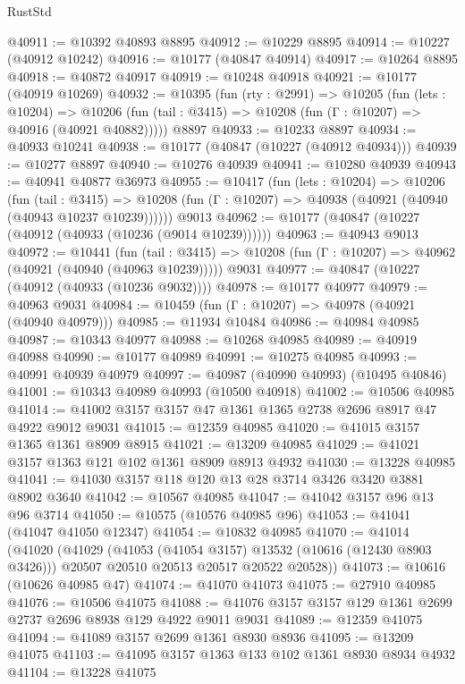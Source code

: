 \begin{lexlean}{RustStd}
\begin{coremodule}
@40911 := @10392 @40893 @8895
@40912 := @10229 @8895
@40914 := @10227 (@40912 @10242)
@40916 := @10177 (@40847 @40914)
@40917 := @10264 @8895
@40918 := @40872 @40917
@40919 := @10248 @40918
@40921 := @10177 (@40919 @10269)
@40932 := @10395
    (fun (rty : @2991) =>
    @10205
      (fun (lets : @10204) =>
      @10206 (fun (tail : @3415) => @10208 (fun (Γ : @10207) => @40916 (@40921 @40882)))))
    @8897
@40933 := @10233 @8897
@40934 := @40933 @10241
@40938 := @10177 (@40847 (@10227 (@40912 @40934)))
@40939 := @10277 @8897
@40940 := @10276 @40939
@40941 := @10280 @40939
@40943 := @40941 @40877 @36973
@40955 := @10417
    (fun (lets : @10204) =>
    @10206
      (fun (tail : @3415) =>
      @10208 (fun (Γ : @10207) => @40938 (@40921 (@40940 (@40943 @10237 @10239))))))
    @9013
@40962 := @10177 (@40847 (@10227 (@40912 (@40933 (@10236 (@9014 @10239))))))
@40963 := @40943 @9013
@40972 := @10441
    (fun (tail : @3415) => @10208 (fun (Γ : @10207) => @40962 (@40921 (@40940 (@40963 @10239)))))
    @9031
@40977 := @40847 (@10227 (@40912 (@40933 (@10236 @9032))))
@40978 := @10177 @40977
@40979 := @40963 @9031
@40984 := @10459 (fun (Γ : @10207) => @40978 (@40921 (@40940 @40979)))
@40985 := @11934 @10484
@40986 := @40984 @40985
@40987 := @10343 @40977
@40988 := @10268 @40985
@40989 := @40919 @40988
@40990 := @10177 @40989
@40991 := @10275 @40985
@40993 := @40991 @40939 @40979
@40997 := @40987 (@40990 @40993) (@10495 @40846)
@41001 := @10343 @40989 @40993 (@10500 @40918)
@41002 := @10506 @40985
@41014 := @41002 @3157 @3157 @47 @1361 @1365 @2738 @2696 @8917 @47 @4922 @9012 @9031
@41015 := @12359 @40985
@41020 := @41015 @3157 @1365 @1361 @8909 @8915
@41021 := @13209 @40985
@41029 := @41021 @3157 @1363 @121 @102 @1361 @8909 @8913 @4932
@41030 := @13228 @40985
@41041 := @41030 @3157 @118 @120 @13 @28 @3714 @3426 @3420 @3881 @8902 @3640
@41042 := @10567 @40985
@41047 := @41042 @3157 @96 @13 @96 @3714
@41050 := @10575 (@10576 @40985 @96)
@41053 := @41041 (@41047 @41050 @12347)
@41054 := @10832 @40985
@41070 := @41014
    (@41020
      (@41029
        (@41053 (@41054 @3157) @13532 (@10616 (@12430 @8903 @3426)))
        @20507
        @20510
        @20513
        @20517
        @20522
        @20528))
@41073 := @10616 (@10626 @40985 @47)
@41074 := @41070 @41073
@41075 := @27910 @40985
@41076 := @10506 @41075
@41088 := @41076 @3157 @3157 @129 @1361 @2699 @2737 @2696 @8938 @129 @4922 @9011 @9031
@41089 := @12359 @41075
@41094 := @41089 @3157 @2699 @1361 @8930 @8936
@41095 := @13209 @41075
@41103 := @41095 @3157 @1363 @133 @102 @1361 @8930 @8934 @4932
@41104 := @13228 @41075

\end{coremodule}
\end{lexlean}
